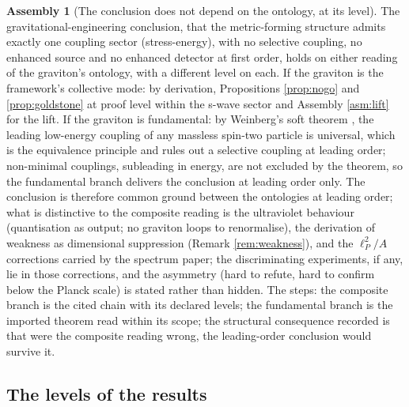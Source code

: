 \documentclass[11pt]{article}
\theoremstyle{definition}
\newtheorem{assembly}[theorem]{Assembly}
\begin{document}
\begin{assembly}[The conclusion does not depend on the ontology, at its level]\label{asm:verdict}
The gravitational-engineering conclusion, that the metric-forming structure admits exactly one coupling sector (stress-energy), with no selective coupling, no enhanced source and no enhanced detector at first order, holds on either reading of the graviton's ontology, with a different level on each. If the graviton is the framework's collective mode: by derivation, Propositions \ref{prop:nogo} and \ref{prop:goldstone} at proof level within the s-wave sector and Assembly \ref{asm:lift} for the lift. If the graviton is fundamental: by Weinberg's soft theorem \cite{Weinberg1964}, the leading low-energy coupling of any massless spin-two particle is universal, which is the equivalence principle and rules out a selective coupling at leading order; non-minimal couplings, subleading in energy, are not excluded by the theorem, so the fundamental branch delivers the conclusion at leading order only. The conclusion is therefore common ground between the ontologies at leading order; what is distinctive to the composite reading is the ultraviolet behaviour (quantisation as output; no graviton loops to renormalise), the derivation of weakness as dimensional suppression (Remark \ref{rem:weakness}), and the $\ell_P^2/A$ corrections carried by the spectrum paper; the discriminating experiments, if any, lie in those corrections, and the asymmetry (hard to refute, hard to confirm below the Planck scale) is stated rather than hidden. The steps: the composite branch is the cited chain with its declared levels; the fundamental branch is the imported theorem read within its scope; the structural consequence recorded is that were the composite reading wrong, the leading-order conclusion would survive it.
\end{assembly}

\subsection*{The levels of the results}
\end{document}
